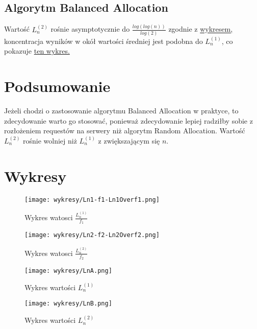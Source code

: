 \documentclass{article}
\begin{document}
\subsection{Algorytm Balanced Allocation}
Wartość $L_n^{(2)}$ rośnie asymptotycznie do $\frac{log(log(n))}{log(2)}$ zgodnie z \hyperref[fig:Ln2]{wykresem,} koncentracja wyników w okół wartości średniej jest podobna do $L_n^{(1)}$, co pokazuje \hyperref[fig:LnB]{ten wykres.}

\section{Podsumowanie}
Jeżeli chodzi o zastosowanie algorytmu Balanced Allocation w praktyce, to zdecydowanie warto go stosować, ponieważ zdecydowanie lepiej radziłby sobie z rozłożeniem requestów na serwery niż algorytm Random Allocation. Wartość $L_n^{(2)}$ rośnie wolniej niż $L_n^{(1)}$ z zwiększającym się $n$. \newline

\section{Wykresy}
\begin{figure}[ht]
    \centering
    \texttt{[image: wykresy/Ln1-f1-Ln1Overf1.png]}
    \caption{Wykres watosci $\frac{L_n^{(1)}}{f_1}$}
    \label{fig:Ln1}
\end{figure}
\begin{figure}[ht]
    \centering
    \texttt{[image: wykresy/Ln2-f2-Ln2Overf2.png]}
    \caption{Wykres watosci $\frac{L_n^{(2)}}{f_2}$}
    \label{fig:Ln2}
\end{figure}
\begin{figure}[ht]
    \centering
    \texttt{[image: wykresy/LnA.png]}
    \caption{Wykres wartości $L_n^{(1)}$}
    \label{fig:LnA}
\end{figure}
\begin{figure}[ht]
    \centering
    \texttt{[image: wykresy/LnB.png]}
    \caption{Wykres wartości $L_n^{(2)}$}
    \label{fig:LnB}
\end{figure}
\end{document}
